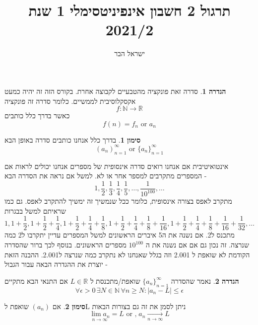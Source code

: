 \documentclass{article}
\begin{document}
\title{תרגול 2 חשבון אינפיניטסימלי 1 שנת 2021/2}
\author{ישראל הבר}
\maketitle

\newtheorem{theorem}{משפט}
\newtheorem{exercise}{תרגיל}
\newtheorem{homeexercise}{תרגיל לבית}
\newtheorem{solution}{Solution Of}
\theoremstyle{definition}
\newtheorem{definition}{הגדרה}
\newtheorem{notation}{סימון}
\newtheorem{claim}{טענה}
\renewcommand\qedsymbol{$\blacksquare$}

\begin{definition}
סדרה זאת פונקציה מהטבעיים לקבוצה אחרת. בקורס הזה זה יהיה כמעט אקסקלוסיבית לממשיים. כלומר סדרה זה פונקציה
\[f:\mathbb{N}\rightarrow\mathbb{R}\]
כאשר בדרך כלל כותבים
\[f(n)=f_n\text{ or } a_n\]
\end{definition}

\begin{notation}
בדרך כלל אנחנו כותבים סדרה באופן הבא 
\[\left( a_n\right)_{n=1}^{\infty} \text{ or } \{a_n\}_{n=1}^{\infty}\]
\end{notation}

אינטואיטיבית אם אנחנו רואים סדרה אינסופית של מספרים אנחנו יכולים לראות אם המספרים מתקרבים למספר אחר או לא. למשל אם נראה את הסדרה הבא - 
\[1, \frac{1}{2}, \frac{1}{3}, \frac{1}{4}, \frac{1}{5},\dots,\frac{1}{10^{100}},\dots\]
מתקרב לאפס בצורה אינסופית, כלומר ככל שנמשיך זה ימשיך להתקרב לאפס. גם כמו שראיתם למשל בבגרות 
\[1, 1+\frac{1}{2}, 1+\frac{1}{2} + \frac{1}{4}, 1+\frac{1}{2} + \frac{1}{4} + \frac{1}{8}, 1+\frac{1}{2} + \frac{1}{4} + \frac{1}{8} + \frac{1}{16},  1+\frac{1}{2} + \frac{1}{4} + \frac{1}{8} + \frac{1}{16} + \frac{1}{32}, \dots\]
מתכנס ל2. אם נשנה את ה5 איברים הראשונים למשל המספרים עדיין יתקרבו ל2 כמה שנרצה. זה נכון גם אם אם נשנה את ה
$10^{100}$
מספרים הראשונים. בנוסף לכך ברור שהסדרה הקודמת לא שואפת ל 2.001 וזה בגלל שאנחנו לא נתקרב כמה שנרצה ל2.001. ההבנה הזאת יוצרת את ההגדרה הבאה עבור הגבול - 

\begin{definition}
נאמר שהסדרה 
$\{a_n\}_{n=1}^{\infty}$
שואפת/מתכנסת ל 
$L\in\mathbb{R}$
אם התנאי הבא מתקיים 
\[\forall\epsilon>0\,\exists N\in\mathbb{N}\,\forall n\geq N: |a_n-L|\leq \epsilon\]
\end{definition}

\begin{notation}
אם 
$(a_n)$
שואפת לL ניתן לסמן את זה גם בצורות הבאות
\[\underset{n\rightarrow\infty}{\lim a_n} = L\text{ or ,}\; a_n\underset{n\rightarrow\infty}{\longrightarrow}L\]
\end{notation}
\end{document}
